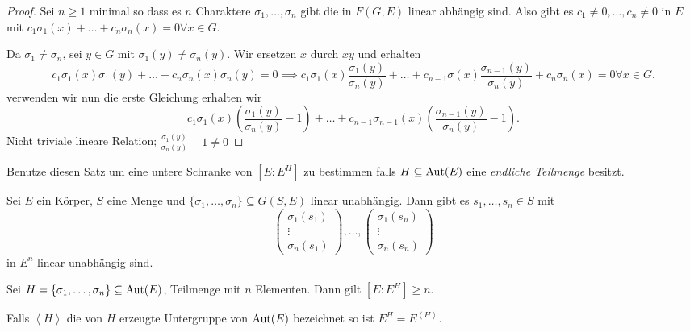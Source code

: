 \begin{proof}
	Sei $n \geq 1$ minimal so dass es $n$ Charaktere $\sigma_1,\ldots,\sigma_{n}$ gibt die in $F(G,E)$ linear abhängig sind.
	Also gibt es $c_1 \neq  0,\ldots, c_{n} \neq 0$ in $E$ mit $c_1 \sigma_1(x) + \ldots + c_{n} \sigma_{n}(x) = 0 \forall x \in G$.

	Da $\sigma_1 \neq \sigma_{n}$, sei $y \in G$ mit $\sigma_1(y) \neq \sigma_{n}(y)$.
	Wir ersetzen $x$ durch $xy$ und erhalten
	\[
		c_1 \sigma_1(x) \sigma_1(y) + \ldots + c_{n} \sigma_{n}(x) \sigma_{n}(y) = 0 \implies c_1 \sigma_1(x) \frac{\sigma_1(y)}{\sigma_{n}(y)} + 
		\ldots + c_{n-1} \sigma(x) \frac{\sigma_{n-1}(y)}{\sigma_{n}(y)} + c_{n} \sigma_{n}(x) = 0 \forall x \in G
	.\] 
	verwenden wir nun die erste Gleichung erhalten wir
	\[
		c_1 \sigma_1(x) \left( \frac{\sigma_1(y)}{\sigma_{n}(y)} - 1 \right) + \ldots + c_{n-1} \sigma_{n-1}(x) \left( \frac{\sigma_{n-1}(y)}{\sigma_{n}(y)} - 1 \right) 
	.\]
	Nicht triviale lineare Relation; $\frac{\sigma_1(y)}{\sigma_{n}(y)}- 1 \neq 0$ \contra
\end{proof}

Benutze diesen Satz um eine untere Schranke von $[E: E^{H}]$ zu bestimmen falls $H \subseteq \operatorname{Aut}(E)$ eine \emph{endliche Teilmenge} besitzt.

\begin{lemma}[Sublemma]
	Sei $E$ ein Körper, $S$ eine Menge und $\{\sigma_1,\ldots,\sigma_{n}\} \subseteq G(S,E)$ linear unabhängig.
	Dann gibt es $s_1,\ldots,s_{n} \in S$ mit 
	\[
		\begin{pmatrix} \sigma_1(s_1) \\ \vdots \\ \sigma_{n}(s_1) \end{pmatrix} ,\ldots, \begin{pmatrix} \sigma_1(s_{n}) \\ \vdots \\ \sigma_{n}(s_{n}) \end{pmatrix} 
	\] 
	in $E^{n}$ linear unabhängig sind.
\end{lemma}

\begin{lemma}
	Sei $H = \{\sigma_1,\ldots,\sigma_{n}\} \subseteq \operatorname{Aut}(E)$, Teilmenge mit $n$ Elementen.
	Dann gilt $[E : E^{H}] \geq n$.
\end{lemma}

\begin{claim}
	Falls $\left< H \right>	$ die von $H$ erzeugte Untergruppe von $\operatorname{Aut}(E)$ bezeichnet so ist $E^{H} = E^{\left< H \right>}$.
\end{claim}

